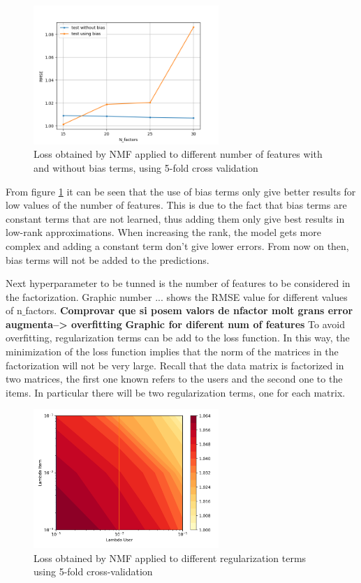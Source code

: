 \documentclass[11pt,conference]{IEEEtran}
\begin{document}
\begin{figure}[ht!]
	\centering
	\includegraphics[width=265px]{Bias.png}
	\caption{Loss obtained by NMF applied to different number of features with and without bias terms, using 5-fold cross validation}
    \label{Bias}
\end{figure}

From figure \ref{Bias} it can be seen that the use of bias terms only give better results for low values of the number of features. This is due to the fact that bias terms are constant terms that are not learned, thus adding them only give best results in low-rank approximations. When increasing the rank, the model gets more complex and adding a constant term don't give lower errors. From now on then, bias terms will not be added to the predictions. 

Next hyperparameter to be tunned is the number of features to be considered in the factorization. Graphic number ... shows the RMSE value for different values of n$\_$factors. \textbf{Comprovar que si posem valors de nfactor molt grans error augmenta--> overfitting} 
\textbf{Graphic for diferent num of features}
To avoid overfitting, regularization terms can be add to the loss function. In this way, the minimization of the loss function implies that the norm of the matrices in the factorization will not be very large. Recall that the data matrix is factorized in two matrices, the first one known refers to the users and the second one to the items. In particular there will be two regularization terms, one for each matrix.

\begin{figure}[ht!]
	\centering
	\includegraphics[width=265px]{lambdas.png}
	\caption{Loss obtained by NMF applied to different regularization terms using 5-fold cross-validation}
    \label{lambdas}
\end{figure}
\end{document}
